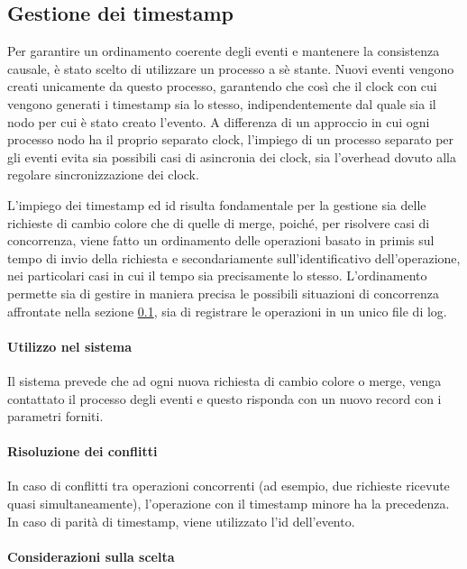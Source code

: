 \documentclass[12pt, a4paper]{report}
\begin{document}
\subsection{Gestione dei timestamp} \label{sec
}

Per garantire un ordinamento coerente degli eventi e mantenere la consistenza causale, \`e stato scelto di utilizzare un processo a s\`e stante. Nuovi eventi vengono creati unicamente da questo processo, garantendo che cos\`i che il clock con cui vengono generati i timestamp sia lo stesso, indipendentemente dal quale sia il nodo per cui \`e stato creato l'evento. A differenza di un approccio in cui ogni processo nodo ha il proprio separato clock, l'impiego di un processo separato per gli eventi evita sia possibili casi di asincronia dei clock, sia l'overhead dovuto alla regolare sincronizzazione dei clock.

L'impiego dei timestamp ed id risulta fondamentale per la gestione sia delle richieste di cambio colore che di quelle di merge, poiché, per risolvere casi di concorrenza, viene fatto un ordinamento delle operazioni basato in primis sul tempo di invio della richiesta e secondariamente sull'identificativo dell'operazione, nei particolari casi in cui il tempo sia precisamente lo stesso. L'ordinamento permette sia di gestire in maniera precisa le possibili situazioni di concorrenza affrontate nella sezione \ref{sec
}, sia di registrare le operazioni in un unico file di log.

\paragraph{Utilizzo nel sistema}

Il sistema prevede che ad ogni nuova richiesta di cambio colore o merge, venga contattato il processo degli eventi e questo risponda con un nuovo record con i parametri forniti.

\paragraph{Risoluzione dei conflitti}

In caso di conflitti tra operazioni concorrenti (ad esempio, due richieste ricevute quasi simultaneamente), l'operazione con il timestamp minore ha la precedenza. In caso di parit\`a di timestamp, viene utilizzato l'id dell'evento.

\paragraph{Considerazioni sulla scelta}
\end{document}
